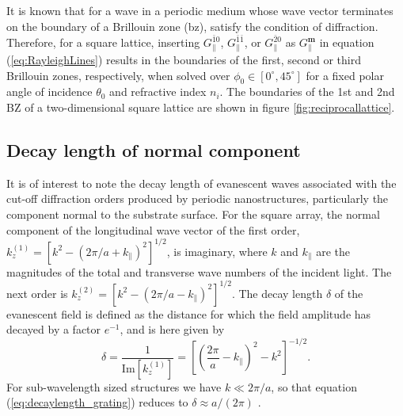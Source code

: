 It is known that for a wave in a periodic medium whose wave vector terminates on the boundary of a Brillouin zone (\ac{bz}), satisfy the condition of diffraction\cite{kittel}. Therefore, for a square lattice, inserting $G_\parallel^{\bar{1}0}$, $G_\parallel^{\bar{1}\bar{1}}$, or $G_\parallel^{\bar{2}0}$ as $G_\parallel^{\mathbf{m}}$ in equation (\ref{eq:RayleighLines}) results in the boundaries of the first, second or third Brillouin zones, respectively, when solved over $\phi_0\in[0^\circ,45^\circ]$ for a fixed polar angle of incidence $\theta_0$ and refractive index $n_i$. The boundaries of the 1st and 2nd BZ of a two-dimensional square lattice are shown in figure \ref{fig:reciprocallattice}.


\subsection{Decay length of normal component}
It is of interest to note the decay length of evanescent waves associated with the cut-off diffraction orders produced by periodic nanostructures, particularly the component normal to the substrate surface. For the square array, the normal component of the longitudinal wave vector of the first order, $k_z^{(1)}=[k^2-(2\pi/a+k_\parallel)^2]^{1/2}$, is imaginary, where $k$ and $k_\parallel$ are the magnitudes of the total and transverse wave numbers of the incident light. The next order is $k_z^{(2)}=[k^2-(2\pi/a-k_\parallel)^2]^{1/2}$. The decay length $\delta$ of the evanescent field is defined as the distance for which the field amplitude has decayed by a factor $e^{-1}$, and is here given by \cite{decaylength_comsolsupport}
\begin{equation}
    \delta = \frac{1}{\text{Im}[k_z^{(1)}]} = \left [ \left ( \frac{2\pi}{a} - k_\parallel \right )^2 - k^2 \right ] ^{-1/2}.
    \label{eq:decaylength_grating}
\end{equation}
For sub-wavelength sized structures we have $k\ll2\pi/a$, so that equation (\ref{eq:decaylength_grating}) reduces to $\delta\approx a/(2\pi)$ \cite{decaylength_comsolsupport}.

